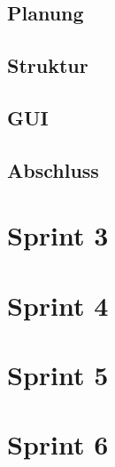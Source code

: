 \documentclass{my_Presentation}
\begin{document}
\subsection*{Planung}

\subsection*{Struktur}

\subsection*{GUI}

\subsection*{Abschluss}



\section{Sprint 3}





\section{Sprint 4}




\section{Sprint 5}

%


\section{Sprint 6}



\end{document}
